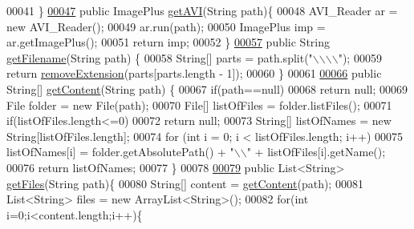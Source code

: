 \begin{DoxyCode}
00041   \}
\hypertarget{_file_manager_8java_source_l00047}{}\hyperlink{classfunctions_1_1_file_manager_a140fc635f053a614aecddfb79baf5905}{00047}   \textcolor{keyword}{public} ImagePlus \hyperlink{classfunctions_1_1_file_manager_a140fc635f053a614aecddfb79baf5905}{getAVI}(String path)\{
00048     AVI\_Reader ar = \textcolor{keyword}{new} AVI\_Reader();
00049     ar.run(path);
00050     ImagePlus imp = ar.getImagePlus();
00051     \textcolor{keywordflow}{return} imp;
00052   \}
\hypertarget{_file_manager_8java_source_l00057}{}\hyperlink{classfunctions_1_1_file_manager_ad027758f34214960a7aa800e0f7c19db}{00057}   \textcolor{keyword}{public} String \hyperlink{classfunctions_1_1_file_manager_ad027758f34214960a7aa800e0f7c19db}{getFilename}(String path) \{
00058     String[] parts = path.split(\textcolor{stringliteral}{"\(\backslash\)\(\backslash\)\(\backslash\)\(\backslash\)"});
00059     \textcolor{keywordflow}{return} \hyperlink{classfunctions_1_1_file_manager_a4053142396d8fa1e3d2a2c1974952124}{removeExtension}(parts[parts.length - 1]);
00060   \}
00061   
\hypertarget{_file_manager_8java_source_l00066}{}\hyperlink{classfunctions_1_1_file_manager_a8d912a4b181b284e6c05e0f44f541e48}{00066}   \textcolor{keyword}{public} String[] \hyperlink{classfunctions_1_1_file_manager_a8d912a4b181b284e6c05e0f44f541e48}{getContent}(String path) \{
00067     \textcolor{keywordflow}{if}(path==null)
00068       \textcolor{keywordflow}{return} null;
00069     File folder = \textcolor{keyword}{new} File(path);
00070     File[] listOfFiles = folder.listFiles();
00071     \textcolor{keywordflow}{if}(listOfFiles.length<=0)
00072       \textcolor{keywordflow}{return} null;
00073     String[] listOfNames = \textcolor{keyword}{new} String[listOfFiles.length];
00074     \textcolor{keywordflow}{for} (\textcolor{keywordtype}{int} i = 0; i < listOfFiles.length; i++)
00075       listOfNames[i] = folder.getAbsolutePath() + \textcolor{stringliteral}{"\(\backslash\)\(\backslash\)"} + listOfFiles[i].getName();
00076     \textcolor{keywordflow}{return} listOfNames;
00077   \}
00078   
\hypertarget{_file_manager_8java_source_l00079}{}\hyperlink{classfunctions_1_1_file_manager_a3a54a5574abfddd928b2b8675e8affa6}{00079}   \textcolor{keyword}{public} List<String> \hyperlink{classfunctions_1_1_file_manager_a3a54a5574abfddd928b2b8675e8affa6}{getFiles}(String path)\{
00080     String[] content = \hyperlink{classfunctions_1_1_file_manager_a8d912a4b181b284e6c05e0f44f541e48}{getContent}(path);
00081     List<String> files = \textcolor{keyword}{new} ArrayList<String>();
00082     \textcolor{keywordflow}{for}(\textcolor{keywordtype}{int} i=0;i<content.length;i++)\{

\end{DoxyCode}
